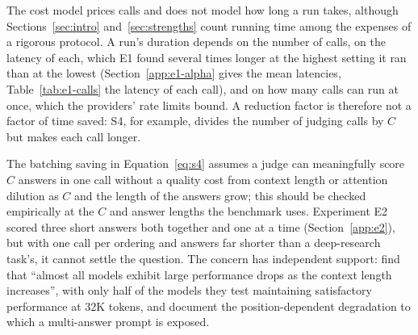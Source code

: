 \documentclass[11pt]{article}
\begin{document}
The cost model prices calls and does not model how long a run takes, although Sections~\ref{sec:intro} and~\ref{sec:strengths} count running time among the expenses of a rigorous protocol. A run's duration depends on the number of calls, on the latency of each, which E1 found several times longer at the highest setting it ran than at the lowest (Section~\ref{app:e1-alpha} gives the mean latencies, Table~\ref{tab:e1-calls} the latency of each call), and on how many calls can run at once, which the providers' rate limits bound. A reduction factor is therefore not a factor of time saved: S4, for example, divides the number of judging calls by $C$ but makes each call longer.

The batching
saving in Equation~\ref{eq:s4} assumes a judge can meaningfully score $C$ answers in one
call without a quality cost from context length or attention dilution as $C$ and the length of the answers grow;
this should be checked empirically at the $C$ and answer lengths the benchmark uses. Experiment E2 scored three short answers both together and one at a time (Section~\ref{app:e2}), but with one call per ordering and answers far shorter than a deep-research task's, it cannot settle the question.
The concern has independent support: \citet{hsieh2024ruler} find that ``almost all models
exhibit large performance drops as the context length increases'', with only half of the
models they test maintaining satisfactory performance at 32K tokens, and
\citet{liu2024lostmiddle} document the position-dependent degradation to which a
multi-answer prompt is exposed.
\end{document}

